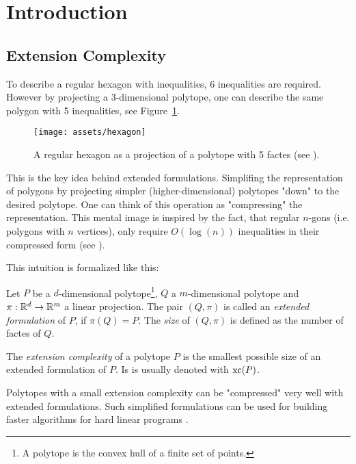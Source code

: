 \section{Introduction} 

\subsection{Extension Complexity}

To describe a regular hexagon with inequalities, 6 inequalities are required. However by projecting a 3-dimensional polytope, one can describe the same polygon with 5 inequalities, see Figure~\ref{fig:hexagon}. 

\begin{figure}[h]
  \centering
  \texttt{[image: assets/hexagon]}
  \caption{A regular hexagon as a projection of a polytope with 5 factes (see \cite{kwan2020extension}).}
  \label{fig:hexagon}
\end{figure}

This is the key idea behind extended formulations. Simplifing the representation of polygons by projecting simpler (higher-dimensional) polytopes "down" to the desired polytope.
One can think of this operation as "compressing" the representation. This mental image is inspired by the fact, that regular $n$-gons (i.e. polygons with $n$ vertices), only require $O(\log(n))$ inequalities in their compressed form (see \cite{kaibel2010constructing}).

This intuition is formalized like this:

\begin{definition}
  Let $P$ be a $d$-dimensional polytope\footnote{A polytope is the convex hull of a finite set of points.}, $Q$ a $m$-dimensional polytope and $\pi:\mathbb{R}^d \to \mathbb{R}^m$ a linear projection.
  The pair $(Q,\pi)$ is called an \textit{extended formulation} of $P$, if $\pi(Q)=P$. The \textit{size} of $(Q,\pi)$ is defined as the number of factes of $Q$.
\end{definition}

\begin{definition}
  The \textit{extension complexity} of a polytope $P$ is the smallest possible size of an extended formulation of $P$. Is is usually denoted with $\operatorname{xc}(P)$.
\end{definition}

Polytopes with a small extension complexity can be "compressed" very well with extended formulations.
Such simplified formulations can be used for building faster algorithms for hard linear programs \cite{yannakakis1991expressing}.



